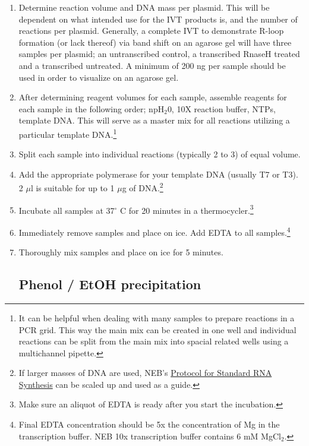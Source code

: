 \documentclass[12pt]{article}
\theoremstyle{definition}
\begin{document}
\begin{enumerate}

\item Determine reaction volume and DNA mass per plasmid. This will be dependent on
what intended use for the IVT products is, and the number of reactions per plasmid. Generally, a complete IVT to demonstrate R-loop formation (or lack thereof) via band shift on an agarose gel will have three samples per plasmid; an untranscribed control, a transcribed RnaseH treated and a transcribed untreated. A minimum of 200 ng per sample should be used in order to visualize on an agarose gel.

\item After determining reagent volumes for each sample, assemble reagents for each sample in the following order; npH$_{2}$0, 10X reaction buffer, NTPs, template DNA. This will serve as a master mix for all reactions utilizing a particular template DNA.\footnote{It can be helpful when dealing with many samples to prepare reactions in a PCR grid. This way the main mix can be created in one well and individual reactions can be split from the main mix into spacial related wells using a multichannel pipette.}

\item Split each sample into individual reactions (typically 2 to 3) of equal volume.

\item Add the appropriate polymerase for your template DNA (usually T7 or T3). 2 $\mu$l is suitable for up to 1 $\mu$g of DNA.\footnote{If larger masses of DNA are used, NEB's \href{https://www.neb.com/protocols/2015/03/09/protocol-for-standard-rna-synthesis}{Protocol for Standard RNA Synthesis} can be scaled up and used as a guide.}

\item Incubate all samples at 37$^{\circ}$ C for 20 minutes in a thermocycler.\footnote{Make sure an aliquot of EDTA is ready after you start the incubation.}

\item Immediately remove samples and place on ice. Add EDTA to all samples.\footnote{Final EDTA concentration should be 5x the concentration of Mg in the transcription buffer. NEB 10x transcription buffer contains 6 mM MgCl$_{2}$.}

\item Thoroughly mix samples and place on ice for 5 minutes.

\subsection*{Phenol / EtOH precipitation}


\end{enumerate}
\end{document}
